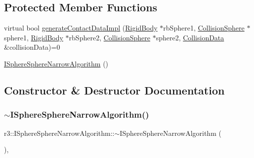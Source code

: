 \subsection*{Protected Member Functions}
\begin{DoxyCompactItemize}
\item 
virtual bool \mbox{\hyperlink{classr3_1_1_i_sphere_sphere_narrow_algorithm_a9e616d04c7ee379d973ec81ea0067cc3}{generate\+Contact\+Data\+Impl}} (\mbox{\hyperlink{classr3_1_1_rigid_body}{Rigid\+Body}} $\ast$rb\+Sphere1, \mbox{\hyperlink{classr3_1_1_collision_sphere}{Collision\+Sphere}} $\ast$sphere1, \mbox{\hyperlink{classr3_1_1_rigid_body}{Rigid\+Body}} $\ast$rb\+Sphere2, \mbox{\hyperlink{classr3_1_1_collision_sphere}{Collision\+Sphere}} $\ast$sphere2, \mbox{\hyperlink{classr3_1_1_collision_data}{Collision\+Data}} \&collision\+Data)=0
\item 
\mbox{\hyperlink{classr3_1_1_i_sphere_sphere_narrow_algorithm_ac7efae14951096a647a7d037f275d75b}{I\+Sphere\+Sphere\+Narrow\+Algorithm}} ()
\end{DoxyCompactItemize}


\subsection{Constructor \& Destructor Documentation}
\mbox{\label{classr3_1_1_i_sphere_sphere_narrow_algorithm_af1abc65f80b07e3af1d3b1c69d6b5db0}} 
\subsubsection{\texorpdfstring{$\sim$\+I\+Sphere\+Sphere\+Narrow\+Algorithm()}{~ISphereSphereNarrowAlgorithm()}}
{\footnotesize\ttfamily r3\+::\+I\+Sphere\+Sphere\+Narrow\+Algorithm\+::$\sim$\+I\+Sphere\+Sphere\+Narrow\+Algorithm (\begin{DoxyParamCaption}{ }\end{DoxyParamCaption})\hspace{0.3cm}{\ttfamily [virtual]}, {\ttfamily [default]}}

\mbox{\label{classr3_1_1_i_sphere_sphere_narrow_algorithm_ac7efae14951096a647a7d037f275d75b}} 
